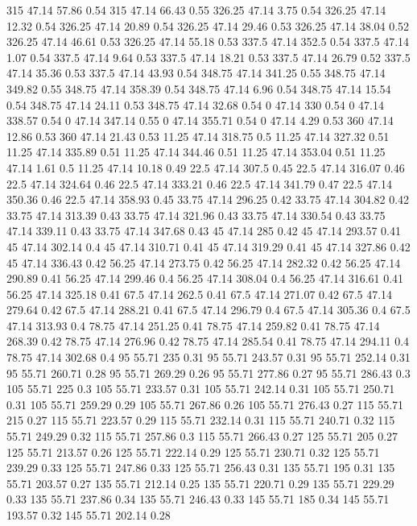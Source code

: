 315	47.14	57.86	0.54
315	47.14	66.43	0.55
326.25	47.14	3.75	0.54
326.25	47.14	12.32	0.54
326.25	47.14	20.89	0.54
326.25	47.14	29.46	0.53
326.25	47.14	38.04	0.52
326.25	47.14	46.61	0.53
326.25	47.14	55.18	0.53
337.5	47.14	352.5	0.54
337.5	47.14	1.07	0.54
337.5	47.14	9.64	0.53
337.5	47.14	18.21	0.53
337.5	47.14	26.79	0.52
337.5	47.14	35.36	0.53
337.5	47.14	43.93	0.54
348.75	47.14	341.25	0.55
348.75	47.14	349.82	0.55
348.75	47.14	358.39	0.54
348.75	47.14	6.96	0.54
348.75	47.14	15.54	0.54
348.75	47.14	24.11	0.53
348.75	47.14	32.68	0.54
0	47.14	330	0.54
0	47.14	338.57	0.54
0	47.14	347.14	0.55
0	47.14	355.71	0.54
0	47.14	4.29	0.53
360	47.14	12.86	0.53
360	47.14	21.43	0.53
11.25	47.14	318.75	0.5
11.25	47.14	327.32	0.51
11.25	47.14	335.89	0.51
11.25	47.14	344.46	0.51
11.25	47.14	353.04	0.51
11.25	47.14	1.61	0.5
11.25	47.14	10.18	0.49
22.5	47.14	307.5	0.45
22.5	47.14	316.07	0.46
22.5	47.14	324.64	0.46
22.5	47.14	333.21	0.46
22.5	47.14	341.79	0.47
22.5	47.14	350.36	0.46
22.5	47.14	358.93	0.45
33.75	47.14	296.25	0.42
33.75	47.14	304.82	0.42
33.75	47.14	313.39	0.43
33.75	47.14	321.96	0.43
33.75	47.14	330.54	0.43
33.75	47.14	339.11	0.43
33.75	47.14	347.68	0.43
45	47.14	285	0.42
45	47.14	293.57	0.41
45	47.14	302.14	0.4
45	47.14	310.71	0.41
45	47.14	319.29	0.41
45	47.14	327.86	0.42
45	47.14	336.43	0.42
56.25	47.14	273.75	0.42
56.25	47.14	282.32	0.42
56.25	47.14	290.89	0.41
56.25	47.14	299.46	0.4
56.25	47.14	308.04	0.4
56.25	47.14	316.61	0.41
56.25	47.14	325.18	0.41
67.5	47.14	262.5	0.41
67.5	47.14	271.07	0.42
67.5	47.14	279.64	0.42
67.5	47.14	288.21	0.41
67.5	47.14	296.79	0.4
67.5	47.14	305.36	0.4
67.5	47.14	313.93	0.4
78.75	47.14	251.25	0.41
78.75	47.14	259.82	0.41
78.75	47.14	268.39	0.42
78.75	47.14	276.96	0.42
78.75	47.14	285.54	0.41
78.75	47.14	294.11	0.4
78.75	47.14	302.68	0.4
95	55.71	235	0.31
95	55.71	243.57	0.31
95	55.71	252.14	0.31
95	55.71	260.71	0.28
95	55.71	269.29	0.26
95	55.71	277.86	0.27
95	55.71	286.43	0.3
105	55.71	225	0.3
105	55.71	233.57	0.31
105	55.71	242.14	0.31
105	55.71	250.71	0.31
105	55.71	259.29	0.29
105	55.71	267.86	0.26
105	55.71	276.43	0.27
115	55.71	215	0.27
115	55.71	223.57	0.29
115	55.71	232.14	0.31
115	55.71	240.71	0.32
115	55.71	249.29	0.32
115	55.71	257.86	0.3
115	55.71	266.43	0.27
125	55.71	205	0.27
125	55.71	213.57	0.26
125	55.71	222.14	0.29
125	55.71	230.71	0.32
125	55.71	239.29	0.33
125	55.71	247.86	0.33
125	55.71	256.43	0.31
135	55.71	195	0.31
135	55.71	203.57	0.27
135	55.71	212.14	0.25
135	55.71	220.71	0.29
135	55.71	229.29	0.33
135	55.71	237.86	0.34
135	55.71	246.43	0.33
145	55.71	185	0.34
145	55.71	193.57	0.32
145	55.71	202.14	0.28
